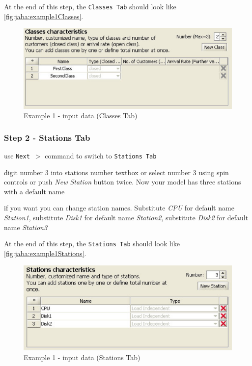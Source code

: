 At the end of this step, the \texttt{Classes Tab} should look like
\autoref{fig:jaba:example1Classes}.

\begin{figure}[htbp]
    \begin{center}
        \includegraphics[scale=.7]{img/jaba/example1Class}
    \end{center}
    \caption{Example 1 - input data (Classes Tab)}
    \label{fig:jaba:example1Classes}
\end{figure}

\subsubsection{Step 2 - Stations Tab}
\begin{itemize*}
\item use \texttt{Next $>$} command to switch to \texttt{Stations Tab}
\item digit number 3 into stations number textbox or select number
3 using spin controls or push \emph{New Station} button twice.
Now your model has three stations with a default name
\item if you want you can change station names. Substitute \emph{CPU} for
default name \emph{Station1}, substitute \emph{Disk1} for default
name \emph{Station2}, substitute \emph{Disk2} for default name
\emph{Station3}
\end{itemize*}

At the end of this step, the \texttt{Stations Tab} should look like
\autoref{fig:jaba:example1Stations}.

\begin{figure}[htbp]
    \begin{center}
        \includegraphics[scale=.7]{img/jaba/example1Stations}
    \end{center}
    \caption{Example 1 - input data (Stations Tab)}
    \label{fig:jaba:example1Stations}
\end{figure}

